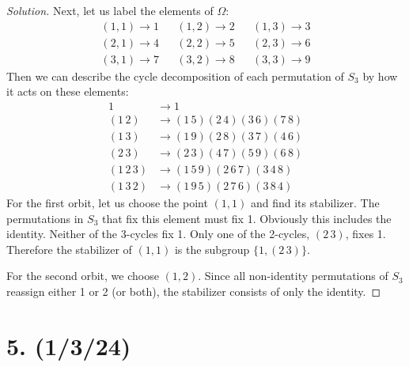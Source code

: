 \documentclass{article}
\begin{document}
\begin{proof}[Solution]
    Next, let us label the elements of $\Omega$:
    \begin{align*}
        (1, 1) \rightarrow 1 & & (1, 2) \rightarrow 2 & & (1, 3) \rightarrow 3 \\
        (2, 1) \rightarrow 4 & & (2, 2) \rightarrow 5 & & (2, 3) \rightarrow 6 \\
        (3, 1) \rightarrow 7 & & (3, 2) \rightarrow 8 & & (3, 3) \rightarrow 9
    \end{align*}
    Then we can describe the cycle decomposition of each permutation of $S_3$ by how it acts on these elements:
    \begin{align*}
        1 &\rightarrow 1 \\
        (1\,2) &\rightarrow (1\,5)(2\,4)(3\,6)(7\,8) \\
        (1\,3) &\rightarrow (1\,9)(2\,8)(3\,7)(4\,6) \\
        (2\,3) &\rightarrow (2\,3)(4\,7)(5\,9)(6\,8) \\
        (1\,2\,3) &\rightarrow (1\,5\,9)(2\,6\,7)(3\,4\,8) \\
        (1\,3\,2) &\rightarrow (1\,9\,5)(2\,7\,6)(3\,8\,4)
    \end{align*}
    For the first orbit, let us choose the point $(1, 1)$ and find its stabilizer. The permutations in $S_3$ that fix this element must fix 1. Obviously this includes the identity. Neither of the 3-cycles fix 1. Only one of the 2-cycles, $(2\,3)$, fixes 1. Therefore the stabilizer of $(1, 1)$ is the subgroup $\{ 1, (2\,3) \}$.

    For the second orbit, we choose $(1, 2)$. Since all non-identity permutations of $S_3$ reassign either 1 or 2 (or both), the stabilizer consists of only the identity.
\end{proof}

\section*{5. (1/3/24)}
\end{document}
